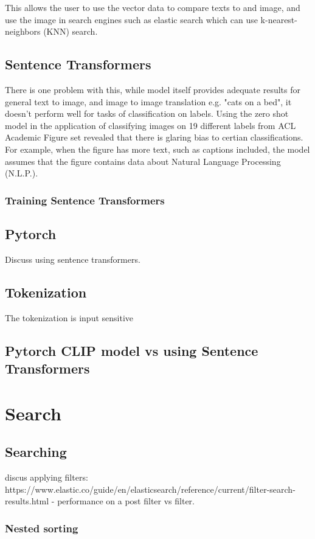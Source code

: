 \documentclass[article, 10pt]{article}
\begin{document}
This allows the user to use the vector data to compare texts to and image, and use the image in search engines such as elastic search which can use  k-nearest-neighbors (KNN) search. 

\subsection{Sentence Transformers}


There is one problem with this, while model itself provides adequate results for general text to image, and image to image translation e.g. "cats on a bed", it doesn't perform well for tasks of classification on labels. Using the zero shot model in the application of classifying images on 19 different labels from ACL Academic Figure set revealed that there is glaring bias to certian classifications. For example, when the figure has more text, such as captions included, the model assumes that the figure contains data about Natural Language Processing (N.L.P.).

\subsubsection{Training Sentence Transformers}
\subsection{Pytorch} Discuss using sentence transformers. 
\subsection{Tokenization} The tokenization is input sensitive
\subsection{Pytorch CLIP model vs using Sentence Transformers }

\section{Search}
\subsection{Searching} discus applying filters: https://www.elastic.co/guide/en/elasticsearch/reference/current/filter-search-results.html
  - performance on a post filter vs filter.
\subsubsection{Nested sorting}
\end{document}
